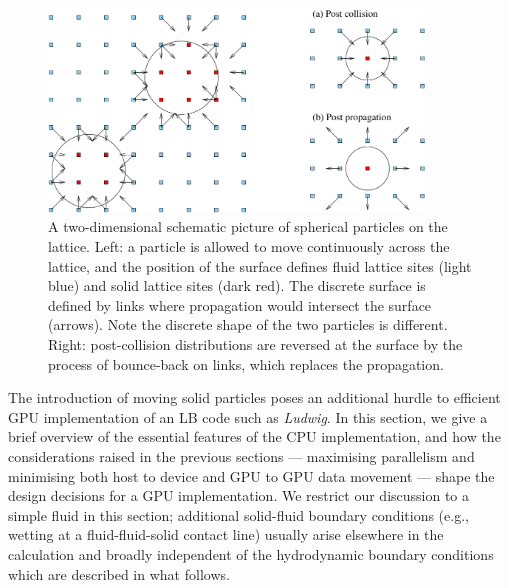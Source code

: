\begin{figure}[t]
\centering
\includegraphics[width=10cm]{Chapters/chapter14/figures/colloid_new}
\caption[Interaction of spherical particles with lattice Boltzmann fluid.]{
A two-dimensional schematic picture of spherical particles on the lattice.
Left: a particle is allowed
to move continuously across the lattice, and the position of the
surface defines fluid lattice sites (light blue) and solid lattice
sites (dark red). The discrete surface is defined by links
where propagation would intersect the surface (arrows). Note the
discrete shape of the two particles is different. Right: post-collision
distributions are reversed at the surface by the process of bounce-back
on links, which replaces the propagation.
}
\label{ch14:fig:bbl}
\end{figure}




The introduction of moving solid particles poses an additional hurdle
to efficient GPU implementation of an LB code such as \textit{Ludwig}.
In this section, we give a brief overview of the essential features
of the CPU implementation, and how the considerations raised in the
previous sections --- maximising parallelism and minimising both
host to device and GPU to GPU data movement --- shape the design decisions
for a GPU implementation. We restrict our discussion to a simple fluid
in this section; additional solid-fluid boundary conditions (e.g.,
wetting at a fluid-fluid-solid contact line) usually arise elsewhere
in the calculation and broadly independent of the hydrodynamic boundary
conditions which are described in what follows.

